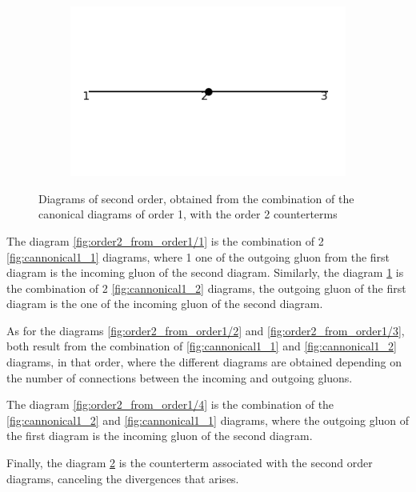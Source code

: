 \documentclass[11pt,a4paper,twoside,pdf]{article}
\numberwithin{equation}{section}
\begin{document}
\begin{figure}[h!]
\begin{subfigure}[t]{0.24\textwidth}
        \caption{ }
        \label{fig:order2_from_order1/5}
    \end{subfigure}
    \begin{subfigure}[t]{0.24\textwidth}
        \centering
        \includegraphics[width=\textwidth]{plots/order2/from_order1/counterterms/1.png}
        \caption{ }
        \label{fig:order2_from_order1/counterterms}
    \end{subfigure}
    \caption{Diagrams of second order, obtained from the combination of the canonical
diagrams of order 1, with the order 2 counterterms}
    \label{fig:order2_from_order1}
\end{figure}

The diagram \ref{fig:order2_from_order1/1} is the combination of 2 
\ref{fig:cannonical1_1} diagrams, where 1 one of the outgoing gluon from the first
diagram is the incoming gluon of the second diagram. Similarly, the diagram
\ref{fig:order2_from_order1/5} is the combination of 2 \ref{fig:cannonical1_2} diagrams, 
the outgoing gluon of the first diagram is the one of the incoming gluon of the 
second diagram.

As for the diagrams \ref{fig:order2_from_order1/2} and \ref{fig:order2_from_order1/3}, 
both result from the combination of \ref{fig:cannonical1_1} and \ref{fig:cannonical1_2} diagrams,
in that order, where the different diagrams are obtained depending on the number of
connections between the incoming and outgoing gluons.

The diagram \ref{fig:order2_from_order1/4} is the combination of the
\ref{fig:cannonical1_2} and \ref{fig:cannonical1_1} diagrams, where the outgoing gluon
of the first diagram is the incoming gluon of the second diagram.

Finally, the diagram \ref{fig:order2_from_order1/counterterms} is the counterterm
associated with the second order diagrams, canceling the divergences that arises.
\end{document}
